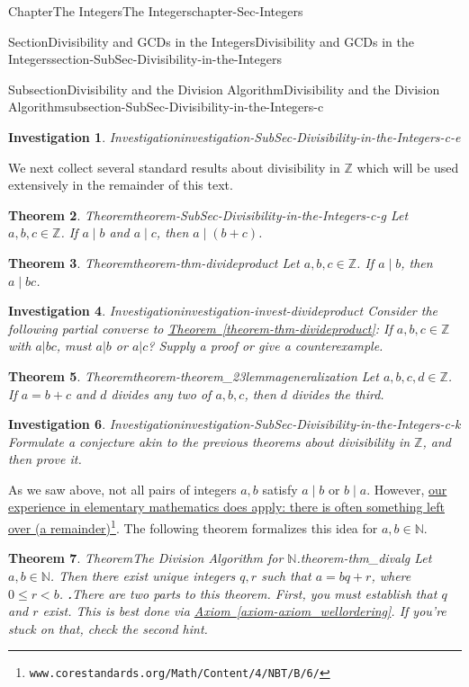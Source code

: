 \documentclass[oneside,10pt,]{book}
\newcommand{\blocktitlefont}{\relax}
\newcommand{\xreffont}{\relax}
\numberwithin{equation}{section}
\renewcommand{\le}{\leqslant}
\def\Z{{\mathbb Z}}
\def\N{{\mathbb N}}
\newtheorem{theorem}{Theorem}[section]
\newtheorem{investigation}[theorem]{Investigation}
\newcommand{\lt}{<}
\begin{document}
\begin{chapterptx}{Chapter}{The Integers}{}{The Integers}{}{}{chapter-Sec-Integers}
\begin{sectionptx}{Section}{Divisibility and GCDs in the Integers}{}{Divisibility and GCDs in the Integers}{}{}{section-SubSec-Divisibility-in-the-Integers}
\begin{subsectionptx}{Subsection}{Divisibility and the Division Algorithm}{}{Divisibility and the Division Algorithm}{}{}{subsection-SubSec-Divisibility-in-the-Integers-c}
\begin{investigation}{Investigation}{}{investigation-SubSec-Divisibility-in-the-Integers-c-e}
\end{investigation}%
We next collect several standard results about divisibility in \(\Z\) which will be used extensively in the remainder of this text.%
\begin{theorem}{Theorem}{}{}{theorem-SubSec-Divisibility-in-the-Integers-c-g}%
Let \(a,b,c\in\Z\). If \(a\mid b\) and \(a\mid c\), then \(a\mid (b+c)\).%
\end{theorem}
\begin{theorem}{Theorem}{}{}{theorem-thm-divideproduct}%
Let \(a,b,c\in\Z\). If \(a\mid b\), then \(a\mid bc\).%
\end{theorem}
\begin{investigation}{Investigation}{}{investigation-invest-divideproduct}%
Consider the following partial converse to \hyperref[theorem-thm-divideproduct]{Theorem~{\xreffont\ref{theorem-thm-divideproduct}}}: If \(a,b,c\in\Z\) with \(a|bc\), must \(a|b\) or \(a|c\)? Supply a proof or give a counterexample.%
\end{investigation}%
\begin{theorem}{Theorem}{}{}{theorem-theorem_23lemmageneralization}%
Let \(a,b,c,d\in \Z\). If \(a = b+c\) and \(d\) divides any two of \(a,b,c\), then \(d\) divides the third.%
\end{theorem}
\begin{investigation}{Investigation}{}{investigation-SubSec-Divisibility-in-the-Integers-c-k}%
Formulate a conjecture akin to the previous theorems about divisibility in \(\Z\), and then prove it.%
\end{investigation}%
As we saw above, not all pairs of integers \(a,b\) satisfy \(a\mid b\) or \(b\mid a\). However, \href{http://www.corestandards.org/Math/Content/4/NBT/B/6/}{our experience in elementary mathematics does apply: there is often something left over (a remainder)}\footnote{\nolinkurl{www.corestandards.org/Math/Content/4/NBT/B/6/}\label{fn-SubSec-Divisibility-in-the-Integers-c-l-e}}. The following theorem formalizes this idea for \(a,b\in \N\).%
\begin{theorem}{Theorem}{The Division Algorithm for \(\N\).}{}{theorem-thm_divalg}%
\index{Division Algorithm (\(\N\))}%
Let \(a,b\in \N\). Then there exist unique integers \(q,r\) such that \(a = bq + r\), where \(0 \le r \lt b\).%
\noindent\textbf{\blocktitlefont 1.}\quad{}There are two parts to this theorem. First, you must establish that \(q\) and \(r\) exist. This is best done via \hyperref[axiom-axiom_wellordering]{Axiom~{\xreffont\ref{axiom-axiom_wellordering}}}. If you're stuck on that, check the second hint.%

\end{theorem}
\end{subsectionptx}
\end{sectionptx}
\end{chapterptx}
\end{document}
